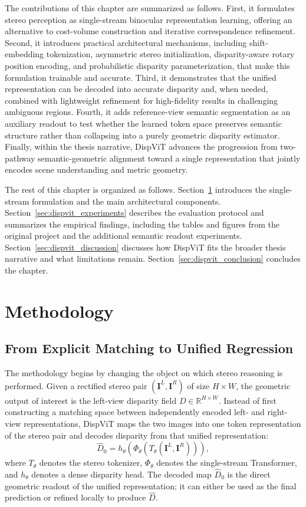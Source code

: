 The contributions of this chapter are summarized as follows.
First, it formulates stereo perception as single-stream binocular representation learning, offering an alternative to cost-volume construction and iterative correspondence refinement.
Second, it introduces practical architectural mechanisms, including shift-embedding tokenization, asymmetric stereo initialization, disparity-aware rotary position encoding, and probabilistic disparity parameterization, that make this formulation trainable and accurate.
Third, it demonstrates that the unified representation can be decoded into accurate disparity and, when needed, combined with lightweight refinement for high-fidelity results in challenging ambiguous regions.
Fourth, it adds reference-view semantic segmentation as an auxiliary readout to test whether the learned token space preserves semantic structure rather than collapsing into a purely geometric disparity estimator.
Finally, within the thesis narrative, DispViT advances the progression from two-pathway semantic-geometric alignment toward a single representation that jointly encodes scene understanding and metric geometry.

The rest of this chapter is organized as follows.
Section~\ref{sec:dispvit_method} introduces the single-stream formulation and the main architectural components.
Section~\ref{sec:dispvit_experiments} describes the evaluation protocol and summarizes the empirical findings, including the tables and figures from the original project and the additional semantic readout experiments.
Section~\ref{sec:dispvit_discussion} discusses how DispViT fits the broader thesis narrative and what limitations remain.
Section~\ref{sec:dispvit_conclusion} concludes the chapter.

\section{Methodology}
\label{sec:dispvit_method}

\subsection{From Explicit Matching to Unified Regression}
The methodology begins by changing the object on which stereo reasoning is performed.
Given a rectified stereo pair $(\bm{I}^L,\bm{I}^R)$ of size $H \times W$, the geometric output of interest is the left-view disparity field $D \in \mathbb{R}^{H \times W}$.
Instead of first constructing a matching space between independently encoded left- and right-view representations, DispViT maps the two images into one token representation of the stereo pair and decodes disparity from that unified representation:
\begin{equation}
    \hat{D}_0 = h_{\theta}\!\left(\Phi_{\theta}\!\left(T_{\theta}(\bm{I}^L,\bm{I}^R)\right)\right),
    \label{eq:dispvit_regression}
\end{equation}
where $T_{\theta}$ denotes the stereo tokenizer, $\Phi_{\theta}$ denotes the single-stream Transformer, and $h_{\theta}$ denotes a dense disparity head.
The decoded map $\hat{D}_0$ is the direct geometric readout of the unified representation; it can either be used as the final prediction or refined locally to produce $\hat{D}$.


